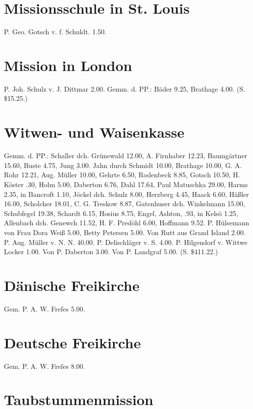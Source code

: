 \section{Missionsschule in St. Louis}

P. Geo. Gotsch v. f. Schuldt. 1.50.

\section{Mission in London}

P. Joh. Schulz v. J. Dittmar 2.00. Gemm. d. PP.: Bäder 9.25, Brathage 4.00. (S. \$15.25.)

\section{Witwen- und Waisenkasse}

Gemm. d. PP.: Schaller dch. Grünewald 12.00, A. Firnhaber 12.23, Baumgärtner 15.60, Buste 4.75, Jung 3.00.  Jahn durch Schmidt 10.00, Brathage 10.00, G. A. Rohr 12.21, Aug. Müller 10.00, Gehrte 6.50, Rodenbeck 8.85, Gotsch 10.50, H. Köster .30, Holm 5.00, Daberton 6.76, Dahl 17.64, Paul Matuschka 29.00, Harms 2.35, in Bancroft 1.10, Jöckel dch. Schulz 8.00, Herzberg 4.45, Haack 6.60, Häßler 16.00, Scholcher 18.01, C. G. Treskow 8.87, Gatenhuser dch. Winkelmann 15.00, Schubfegel 19.38, Schardt 6.15, Hosius 8.75, Engel, Ashton, .93, in Kelsö 1.25, Allenbach dch. Genewch 11.52, H. F. Predöhl 6.00, Hoffmann 9.52. P. Hülsemann von Frau Dora Weiß 5.00, Betty Petersen 5.00. Von Rutt aus Grand Island 2.00. P. Aug. Müller v. N. N. 40.00. P. Delischläger v. S. 4.00. P. Hilgendorf v. Wittwe Locker 1.00. Von P. Daberton 3.00. Von P. Landgraf 5.00. (S. \$411.22.)

\section{Dänische Freikirche}

Gem. P. A. W. Freſes 5.00.

\section{Deutsche Freikirche}

Gem. P. A. W. Freſes 8.00.

\section{Taubstummenmission}

